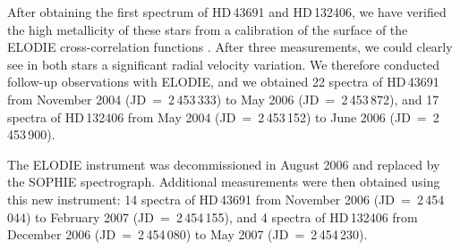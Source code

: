 \documentclass{aa}
\begin{document}
After obtaining the first spectrum of HD\,43691 and HD\,132406, we have
verified the high metallicity of these stars from a calibration of the
surface of the ELODIE cross-correlation functions \citep{Santosetal2002,
Naef2003}. After three measurements, we could clearly see in both stars a
significant radial velocity variation. We therefore conducted follow-up
observations with ELODIE, and we obtained 22 spectra of HD\,43691 from
November 2004 (JD~=~2\,453\,333) to May 2006 (JD~=~2\,453\,872), and 17
spectra of HD\,132406 from May 2004 (JD~=~2\,453\,152) to June 2006
(JD~=~2\,453\,900).

The ELODIE instrument was decommissioned in August 2006 and replaced by the
SOPHIE spectrograph. Additional measurements were then obtained using this
new instrument: 14 spectra of HD\,43691 from November 2006
(JD~=~2\,454\,044) to February 2007 (JD~=~2\,454\,155), and 4 spectra of
HD\,132406 from December 2006 (JD~=~2\,454\,080) to May 2007
(JD~=~2\,454\,230).
\end{document}
